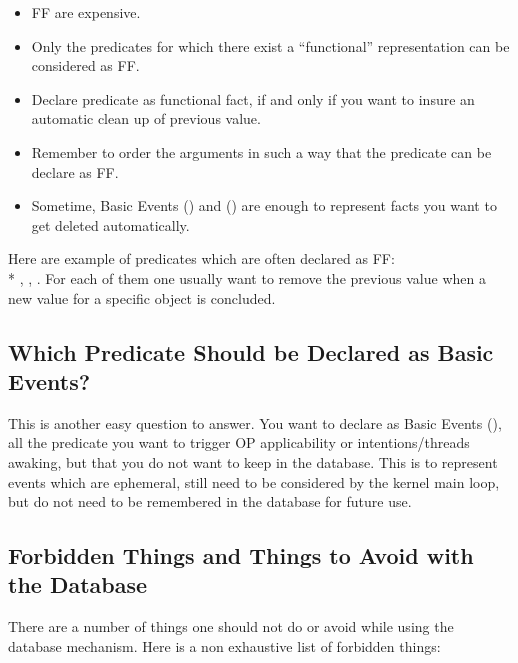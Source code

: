 \begin{itemize}

\item FF are expensive.

\item Only the predicates for which there exist a ``functional''
representation can be considered as FF.

\item Declare predicate as functional fact, if and only if you want to
insure an automatic clean up of previous value.

\item Remember to order the arguments in such a way that the predicate can
be declare as FF.

\item Sometime, Basic Events () and () are enough to represent facts you want to get deleted
automatically.

\end{itemize}

Here are example of predicates which are often declared as FF:\\*
, , . For each of them one
usually want to remove the previous value when a new value for a specific
object is concluded.

\subsection{Which Predicate Should be Declared as Basic Events?}

This is another easy question to answer. You want to declare as Basic
Events (), all the predicate you want to trigger OP
applicability or intentions/threads awaking, but that you do not want to
keep in the database. This is to represent events which are ephemeral,
still need to be considered by the kernel main loop, but do not need to
be remembered in the database for future use.

\subsection{Forbidden Things and Things to Avoid with the Database}

There are a number of things one should not do or avoid while using the
database mechanism. Here is a non exhaustive list of forbidden things:

